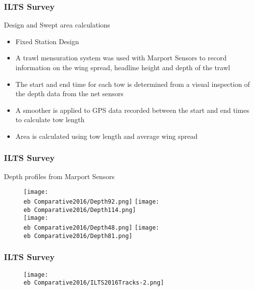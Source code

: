 \documentclass{beamer}
\newcommand{\eb}{\string~/bio.data/bio.lobster/figures/ILTS/} %
\begin{document}
\begin{frame}
\frametitle{ILTS Survey}
Design and Swept area calculations
\begin{itemize}
\item Fixed Station Design 
\item A trawl mensuration system was used with Marport Sensors to record information on the wing spread, headline height and depth of the trawl
\item The start and end time for each tow is determined from a visual inspection of the depth data from the net sensors
\item A smoother is applied to GPS data recorded between the start and end times to calculate tow length 
\item Area is calculated using tow length and average wing spread
\end{itemize}
\end{frame}




\begin{frame}
\frametitle{ILTS Survey}
Depth profiles from Marport Sensors 
\begin{figure}
        \begin{center}
            \texttt{[image: \\eb Comparative2016/Depth92.png]}
            \texttt{[image: \\eb Comparative2016/Depth114.png]}\\
            \texttt{[image: \\eb Comparative2016/Depth48.png]}
            \texttt{[image: \\eb Comparative2016/Depth81.png]}
    \end{center}
   
 \end{figure}

\end{frame}


\begin{frame}
\frametitle{ILTS Survey}
\begin{figure}
        \begin{center}
            \texttt{[image: \\eb Comparative2016/ILTS2016Tracks-2.png]}
        \end{center}
    \end{figure}
\end{frame}
\end{document}
